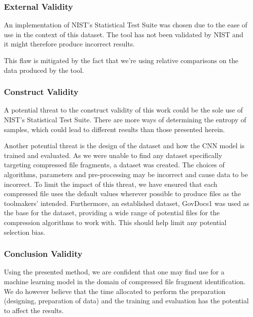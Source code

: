 \documentclass[conference]{IEEEtran}
\begin{document}
\subsubsection{External Validity}
An implementation of NIST's Statistical Test Suite was chosen due to the ease of use in the context of this dataset. The tool has not been validated by NIST and it might therefore produce incorrect results.

This flaw is mitigated by the fact that we're using relative comparisons on the data produced by the tool.

\subsubsection{Construct Validity}
A potential threat to the construct validity of this work could be the sole use of NIST's Statistical Test Suite. There are more ways of determining the entropy of samples, which could lead to different results than those presented herein.

Another potential threat is the design of the dataset and how the CNN model is trained and evaluated. As we were unable to find any dataset specifically targeting compressed file fragments, a dataset was created. The choices of algorithms, parameters and pre-processing may be incorrect and cause data to be incorrect. To limit the impact of this threat, we have ensured that each compressed file uses the default values wherever possible to produce files as the toolmakers' intended. Furthermore, an established dataset, GovDocs1 was used as the base for the dataset, providing a wide range of potential files for the compression algorithms to work with. This should help limit any potential selection bias.

\subsubsection{Conclusion Validity}
\label{section:conclusion-validity}

Using the presented method, we are confident that one may find use for a machine learning model in the domain of compressed file fragment identification. We do however believe that the time allocated to perform the preparation (designing, preparation of data) and the training and evaluation has the potential to affect the results.
\end{document}
